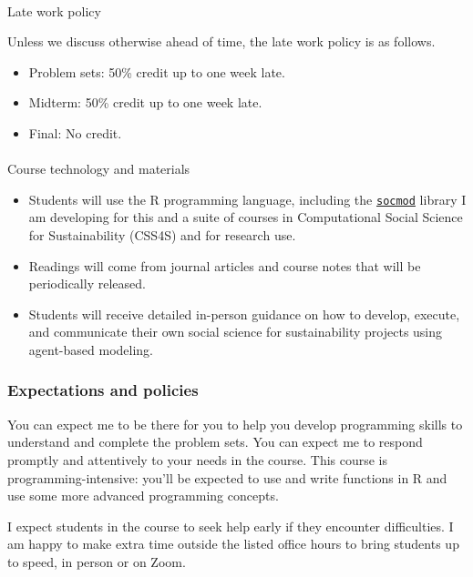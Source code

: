 \documentclass[
  letterpaper,
  DIV=11,
  numbers=noendperiod]{scrartcl}
\makeatletter
\let\oldparagraph\paragraph
\renewcommand{\paragraph}{
    \@ifstar
      \xxxParagraphStar
      \xxxParagraphNoStar
  }
\newcommand{\xxxParagraphStar}[1]{\oldparagraph*{#1}\mbox{}}
\newcommand{\xxxParagraphNoStar}[1]{\oldparagraph{#1}\mbox{}}
\providecommand{\tightlist}{%
  \setlength{\itemsep}{0pt}\setlength{\parskip}{0pt}}\usepackage{longtable,booktabs,array}
\makeatother
\begin{document}
\paragraph{Late work policy}\label{late-work-policy}

Unless we discuss otherwise ahead of time, the late work policy is as
follows.

\begin{itemize}
\tightlist
\item
  Problem sets: 50\% credit up to one week late.
\item
  Midterm: 50\% credit up to one week late.
\item
  Final: No credit.
\end{itemize}

\paragraph{Course technology and
materials}\label{course-technology-and-materials}

\begin{itemize}
\tightlist
\item
  Students will use the R programming language, including the
  \href{https://css4s.github.io/socmod/}{\texttt{socmod}} library I am
  developing for this and a suite of courses in Computational Social
  Science for Sustainability (CSS4S) and for research use.
\item
  Readings will come from journal articles and course notes that will be
  periodically released.
\item
  Students will receive detailed in-person guidance on how to develop,
  execute, and communicate their own social science for sustainability
  projects using agent-based modeling.
\end{itemize}

\subsubsection{Expectations and
policies}\label{expectations-and-policies}

You can expect me to be there for you to help you develop programming
skills to understand and complete the problem sets. You can expect me to
respond promptly and attentively to your needs in the course. This
course is programming-intensive: you'll be expected to use and write
functions in R and use some more advanced programming concepts.

I expect students in the course to seek help early if they encounter
difficulties. I am happy to make extra time outside the listed office
hours to bring students up to speed, in person or on Zoom.
\end{document}

